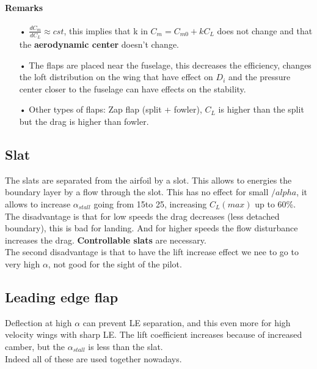 \begin{center}
\begin{minipage}{0.3\textwidth}
	\end{minipage}
	\end{center}
	
\paragraph{Remarks}
	\begin{itemize}
	\item[•] $\frac{dC_m}{dC_L}\approx cst$, this implies that k in $C_m = C_{m0} + k C_L$ does not change and that the \textbf{aerodynamic center} doesn't change. 
	
	\item[•] The flaps are placed near the fuselage, this decreases the efficiency, changes the loft distribution on the wing that have effect on $D_i$ and the pressure center closer to the fuselage can have effects on the stability. 
	
	\item[•] Other types of flaps: Zap flap (split + fowler), $C_L$ is higher than the split but the drag is higher than fowler. 
	\end{itemize}		
	
\subsection{Slat}
	The slats are separated from the airfoil by a slot. This allows to energies the boundary layer by a flow through the slot. This has no effect for small $/alpha$, it allows to increase $\alpha _{stall}$ going from 15\degres to 25\degres, increasing $C_L(max)$ up to 60\%. The disadvantage is that for low speeds the drag decreases (less detached boundary), this is bad for landing. And for higher speeds the flow disturbance increases the drag. \textbf{Controllable slats} are necessary. \\
	
	The second disadvantage is that to have the lift increase effect we nee to go to very high $\alpha$, not good for the sight of the pilot. 
	
\subsection{Leading edge flap}
	Deflection at high $\alpha$ can prevent LE separation, and this even more for high velocity wings with sharp LE. The lift coefficient increases because of increased camber, but the $\alpha _{stall}$ is less than the slat. \\

	Indeed all of these are used together nowadays. 